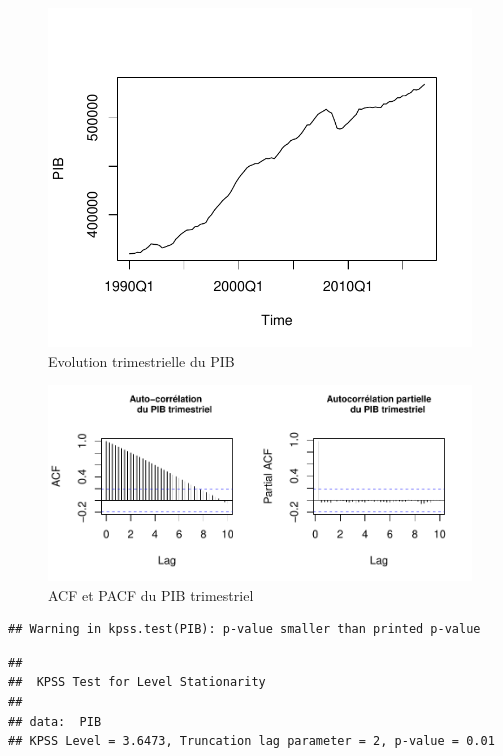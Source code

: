 \documentclass[11pt,]{article}
\begin{document}
\begin{figure}

{\centering \includegraphics{Rapport_final_files/figure-latex/unnamed-chunk-3-1} 

}

\caption{\label{fig3} Evolution trimestrielle du PIB}\label{fig:unnamed-chunk-3}
\end{figure}

\begin{figure}[htbp]
\centering
\includegraphics{Rapport_final_files/figure-latex/unnamed-chunk-4-1.pdf}
\caption{\label{fig4} ACF et PACF du PIB trimestriel}
\end{figure}

\begin{verbatim}
## Warning in kpss.test(PIB): p-value smaller than printed p-value
\end{verbatim}

\begin{verbatim}
## 
##  KPSS Test for Level Stationarity
## 
## data:  PIB
## KPSS Level = 3.6473, Truncation lag parameter = 2, p-value = 0.01
\end{verbatim}
\end{document}
